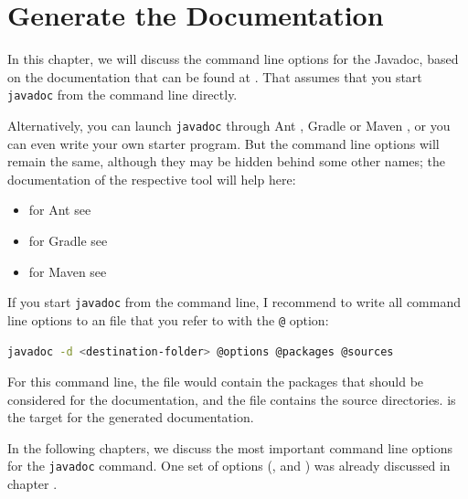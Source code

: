 \section{Generate the Documentation}\label{sec:RunJavadoc}
In this chapter, we will discuss the command line options for the Javadoc, based on the documentation that can be found at \autocite{ORACLE_DOC_JAVADOC_MAN}. That assumes that you start \lstinline|javadoc| from the command line directly.

Alternatively, you can launch \lstinline|javadoc| through Ant \autocite{APACHE_ANT}, Gradle \autocite{GRADLE} or Maven \autocite{APACHE_MAVEN}, or you can even write your own starter program. But the command line options will remain the same, although they may be hidden behind some other names; the documentation of the respective tool will help here:

\begin{itemize}
	\item{for Ant see \autocite{APACHE_ANT:Javadoc}}
	\item{for Gradle see \autocite{GRADLE:Javadoc}}
	\item{for Maven see \autocite{APACHE_MAVEN:Javadoc}}
\end{itemize}

If you start \lstinline|javadoc| from the command line, I recommend to write all command line options to an  file that you refer to with the \verb#@# option:
\begin{lstlisting}[numbers=none,language=sh]
javadoc -d <destination-folder> @options @packages @sources
\end{lstlisting}

For this command line, the  file would contain the packages that should be considered for the documentation, and the  file contains the source directories.  is the target for the generated documentation.

In the following chapters, we discuss the most important command line options for the \texttt{javadoc} command. One set of options (\mbox{}, \mbox{} and \mbox{}) was already discussed in chapter .









